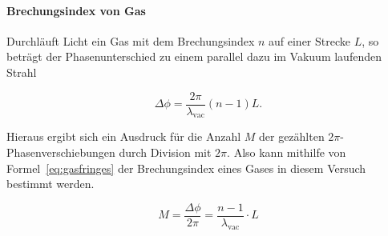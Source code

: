 \paragraph{Brechungsindex von Gas}
Durchläuft Licht ein Gas mit dem Brechungsindex $n$ auf einer Strecke $L$, so beträgt der Phasenunterschied zu einem parallel dazu im Vakuum laufenden Strahl

\begin{equation}
\Delta\phi = \frac{2\pi}{\lambda_\text{vac}}(n-1)L.
\end{equation}

Hieraus ergibt sich ein Ausdruck für die Anzahl $M$ der gezählten $2\pi$-Phasen\-ver\-schie\-bung\-en durch Division mit $2\pi$. Also kann mithilfe von Formel~\eqref{eq:gasfringes} der Brechungsindex eines Gases in diesem Versuch bestimmt werden.

\begin{equation}
M = \frac{\Delta\phi}{2\pi} = \frac{n-1}{\lambda_\text{vac}}\cdot L
\label{eq:gasfringes}
\end{equation}
